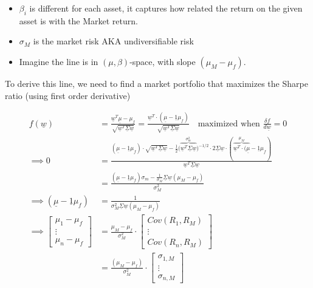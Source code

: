 \documentclass[
  oneside]{book}
\providecommand{\tightlist}{%
  \setlength{\itemsep}{0pt}\setlength{\parskip}{0pt}}
\begin{document}
\begin{itemize}
\tightlist
\item
  \(\beta_{i}\) is different for each asset, it captures how related the return on the given asset is with the Market return.
\item
  \(\sigma_{M}\) is the market risk AKA undiversifiable risk
\item
  Imagine the line is in \((\mu,\beta)\)-space, with slope \((\mu_{M}-\mu_{f})\).
\end{itemize}

To derive this line, we need to find a market portfolio that maximizes the Sharpe ratio (using first order derivative)

\[
\begin{aligned}
f(\underline{w}) &= \frac{\underline{w}^{T}\underline{\mu}-\mu_{f}}{\sqrt{ \underline{w}^{T}\underline{\Sigma}\underline{w} }} = \frac{\underline{w}^{T}\cdot (\underline{\mu}-\underline{1}\mu_{f})}{\sqrt{ \underline{w}^{T}\underline{\Sigma}\underline{w} }} \quad \text{maximized when } \frac{\delta f}{d\underline{w}} = 0\\
\implies 0 &= \frac{(\underline{\mu}-\underline{1}\mu_{f})\cdot\sqrt{ \underline{w}^{T}\underline{\Sigma}\underline{w} } - \frac{1}{2}{(\overbrace{ \underline{w}^{T}\underline{\Sigma}\underline{w}}^{ \sigma_{m}^{2} }})^{-1/2}\cdot 2\underline{\Sigma}\underline{w}\cdot (\overbrace{ \underline{w}^{T}\cdot (\underline{\mu} }^{ \mu_{M} }-\underline{1}\mu_{f})}{\underline{w}^{T}\underline{\Sigma}\underline{w}}\\
&= \frac{(\underline{\mu}-\underline{1}\mu_{f})\sigma_{m}-\frac{1}{\sigma_{M}}\underline{\Sigma}\underline{w}(\mu_{M}-\mu_{f})}{\sigma_{M}^{2}}\\
\implies (\underline{\mu}-\underline{1}\mu_{f}) &= \frac{1}{\sigma_{M}^{2}\underline{\Sigma}\underline{w}(\mu_{M}-\mu_{f})}\\
\implies \left[ \begin{array}{c}
\mu_{1}-\mu_{f} \\
\vdots \\
\mu_{n}-\mu_{f}
\end{array}  \right] 
&= \frac{\mu_{M}-\mu_{f}}{\sigma_{M}^{2}}\cdot 
\left[ \begin{array}{c}
Cov(R_{1},R_{M}) \\
\vdots \\
Cov(R_{n},R_{M})
\end{array} \right] \\
&= \frac{(\mu_{M}-\mu_{f})}{\sigma_{M}^{2}}\cdot \left[ \begin{array}{c}
\sigma_{1,M} \\
\vdots \\
\sigma_{n,M}
\end{array} \right] 
\end{aligned}
\]
\end{document}
